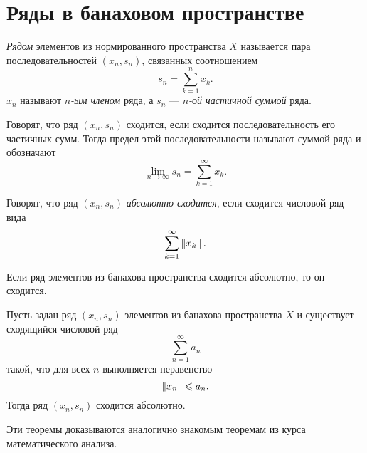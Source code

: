 \section{Ряды в банаховом пространстве}
\begin{definition}
    \emph{Рядом} элементов из нормированного пространства $X$ называется пара
    последовательностей $(x_n, s_n)$, связанных соотношением
    \[ s_n = \sum_{k=1}^n x_k. \]
    $x_n$ называют \emph{$n$-ым членом} ряда, а $s_n$ --- \emph{$n$-ой частичной
    суммой} ряда.
\end{definition}

\begin{definition}
    Говорят, что ряд $(x_n, s_n)$ сходится, если сходится последовательность его
    частичных сумм. Тогда предел этой последовательности называют суммой ряда и
    обозначают
    \[ \lim_{n\to\infty} s_n = \sum_{k=1}^\infty x_k. \]
\end{definition}

\begin{definition}
    Говорят, что ряд $(x_n, s_n)$ \emph{абсолютно сходится}, если сходится числовой ряд
    вида
    \[ \sum_{k=1}^\infty \left\|x_k\right\|. \]
\end{definition}

\begin{theorem}
    Если ряд элементов из банахова пространства 
    сходится абсолютно, то он сходится.
\end{theorem}

\begin{theorem}
    Пусть задан ряд $(x_n, s_n)$ элементов из банахова пространства $X$ и
    существует сходящийся числовой ряд
    \[ \sum_{n = 1}^\infty a_n \]
    такой, что для всех $n$ выполняется неравенство
    \[ \left\|x_n\right\| \leqslant a_n. \]
    Тогда ряд $(x_n, s_n)$ сходится абсолютно.
\end{theorem}

Эти теоремы доказываются аналогично знакомым теоремам из курса математического
анализа.
